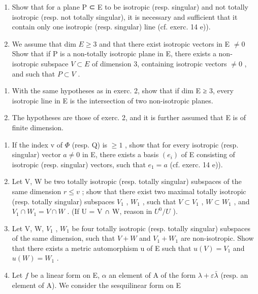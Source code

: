 \begin{enumerate}
\def\labelenumi{\alph{enumi})}
\item
  Show that for a plane P ⊂ E to be isotropic (resp. singular) and not totally isotropic (resp. not totally singular), it is necessary and sufficient that it contain only one isotropic (resp. singular) line (cf. exerc. 14 e)).
\item
  We assume that dim \(E \geqslant 3\) and that there exist isotropic vectors in E \(\neq 0\) Show that if P is a non-totally isotropic plane in E, there exists a non-isotropic subspace \(V \subset E\) of dimension 3, containing isotropic vectors \(\neq 0\) , and such that \(P \subset V\) .
\end{enumerate}

\begin{enumerate}
\def\labelenumi{\arabic{enumi})}
\setcounter{enumi}{2}
\item
  With the same hypotheses as in exerc. 2, show that if dim E ≥ 3, every isotropic line in E is the intersection of two non-isotropic planes.
\item
  The hypotheses are those of exerc. 2, and it is further assumed that E is of finite dimension.
\end{enumerate}

\begin{enumerate}
\def\labelenumi{\alph{enumi})}
\item
  If the index v of \(\Phi\) (resp. Q) is \(\geqslant 1\) , show that for every isotropic (resp. singular) vector \(a \neq 0\) in E, there exists a basis \((e_i)\) of E consisting of isotropic (resp. singular) vectors, such that \(e_1 = a\) (cf. exerc. 14 e)).
\item
  Let V, W be two totally isotropic (resp. totally singular) subspaces of the same dimension \(r \leqslant v\) ; show that there exist two maximal totally isotropic (resp. totally singular) subspaces \(V_{1}\) , \(W_{1}\) , such that \(V \subset V_{1}\) , \(W \subset W_{1}\) , and \(V_{1} \cap W_{1} = V \cap W\) . (If U = V ∩ W, reason in \(U^{0}/U\) ).
\item
  Let V, W, \(V_{1}\) , \(W_{1}\) be four totally isotropic (resp. totally singular) subspaces of the same dimension, such that \(V + W\) and \(V_{1} + W_{1}\) are non-isotropic. Show that there exists a metric automorphism u of E such that \(u(V) = V_{1}\) and \(u(W) = W_{1}\) .
\item
  Let \(f\) be a linear form on E, \(\alpha\) an element of A of the form \(\lambda + \varepsilon\bar{\lambda}\) (resp. an element of A). We consider the sesquilinear form on E
\end{enumerate}

